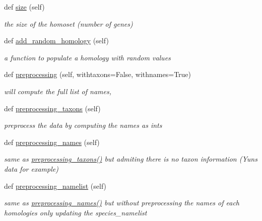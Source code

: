 \begin{DoxyCompactItemize}
def \mbox{\hyperlink{class_py_c_u_b_1_1homoset_1_1_homo_set_a000511647e3f85d8abadcdddaddfb04d}{size}} (self)
\begin{DoxyCompactList}\small\item\em the size of the homoset (number of genes) \end{DoxyCompactList}\item 
def \mbox{\hyperlink{class_py_c_u_b_1_1homoset_1_1_homo_set_a05935a3f03f2e2b61b2f3e7e0222e2a9}{add\+\_\+random\+\_\+homology}} (self)
\begin{DoxyCompactList}\small\item\em a function to populate a homology with random values \end{DoxyCompactList}\item 
def \mbox{\hyperlink{class_py_c_u_b_1_1homoset_1_1_homo_set_a3f689e03251e7b4fe262a86d08946998}{preprocessing}} (self, withtaxons=False, withnames=True)
\begin{DoxyCompactList}\small\item\em will compute the full list of names, \end{DoxyCompactList}\item 
def \mbox{\hyperlink{class_py_c_u_b_1_1homoset_1_1_homo_set_aa39455620288b4912e5540491913e792}{preprocessing\+\_\+taxons}} (self)
\begin{DoxyCompactList}\small\item\em preprocess the data by computing the names as ints \end{DoxyCompactList}\item 
def \mbox{\hyperlink{class_py_c_u_b_1_1homoset_1_1_homo_set_a36cf71a7bc24b788c4d526591a8ec376}{preprocessing\+\_\+names}} (self)
\begin{DoxyCompactList}\small\item\em same as \mbox{\hyperlink{class_py_c_u_b_1_1homoset_1_1_homo_set_aa39455620288b4912e5540491913e792}{preprocessing\+\_\+taxons()}} but admiting there is no taxon information (Yun\textquotesingle{}s data for example) \end{DoxyCompactList}\item 
def \mbox{\hyperlink{class_py_c_u_b_1_1homoset_1_1_homo_set_a4060c440127aa861c17b6157c81e2d27}{preprocessing\+\_\+namelist}} (self)
\begin{DoxyCompactList}\small\item\em same as \mbox{\hyperlink{class_py_c_u_b_1_1homoset_1_1_homo_set_a36cf71a7bc24b788c4d526591a8ec376}{preprocessing\+\_\+names()}} but without preprocessing the names of each homologies only updating the species\+\_\+namelist \end{DoxyCompactList}\item 

\end{DoxyCompactItemize}

